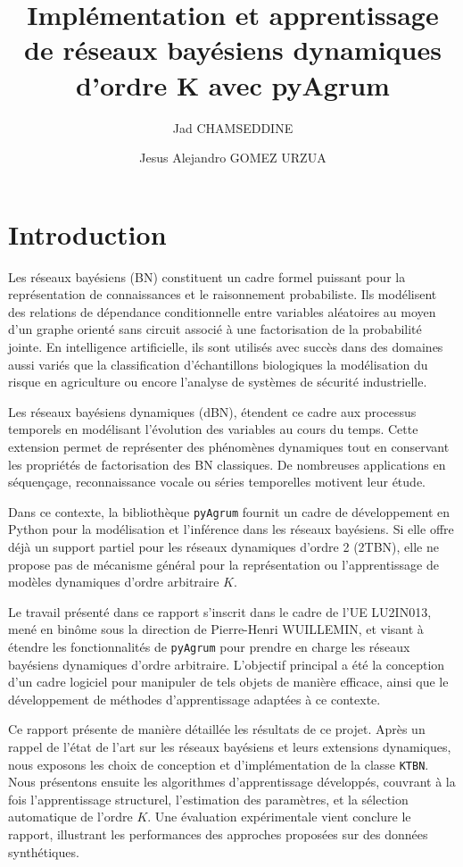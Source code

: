 \documentclass{article}
\title{Implémentation et apprentissage de réseaux bayésiens dynamiques d'ordre K avec pyAgrum}
\author{Jad CHAMSEDDINE \and Jesus Alejandro GOMEZ URZUA}
\begin{document}
\maketitle

\setcounter{tocdepth}{2}
\tableofcontents

\section{Introduction}


Les réseaux bayésiens (BN) constituent un cadre formel puissant pour la représentation de connaissances et le raisonnement
probabiliste. Ils modélisent des relations de dépendance conditionnelle entre variables aléatoires au moyen d'un graphe
orienté sans circuit associé à une factorisation de la probabilité jointe. En intelligence artificielle, ils sont utilisés
avec succès dans des domaines aussi variés que la classification d'échantillons biologiques\cite{doi:10.1021/jf9013235}
la modélisation du risque en agriculture\cite{BRESSAN2009579} ou encore l'analyse de systèmes de sécurité
industrielle\cite{KANNAN2007255}.

Les réseaux bayésiens dynamiques (dBN), étendent ce cadre aux processus temporels en modélisant l'évolution des variables
au cours du temps. Cette extension permet de représenter des phénomènes dynamiques tout en conservant les propriétés de
factorisation des BN classiques. De nombreuses applications en séquençage, reconnaissance vocale ou séries temporelles
motivent leur étude. \cite{perrin2003gene, zweig1998speech}

Dans ce contexte, la bibliothèque \texttt{pyAgrum} fournit un cadre de développement en Python pour la modélisation et
l'inférence dans les réseaux bayésiens. Si elle offre déjà un support partiel pour les réseaux dynamiques d'ordre 2
(2TBN), elle ne propose pas de mécanisme général pour la représentation ou l'apprentissage de modèles dynamiques d'ordre
arbitraire $K$.

Le travail présenté dans ce rapport s'inscrit dans le cadre de l'UE LU2IN013, mené en binôme sous la direction de
Pierre-Henri WUILLEMIN, et visant à étendre les fonctionnalités de \texttt{pyAgrum} pour prendre en charge les réseaux
bayésiens dynamiques d'ordre arbitraire. L'objectif principal a été la conception d'un cadre logiciel pour manipuler de
tels objets de manière efficace, ainsi que le développement de méthodes d'apprentissage adaptées à ce contexte.

Ce rapport présente de manière détaillée les résultats de ce projet. Après un rappel de l'état de l'art sur les réseaux
bayésiens et leurs extensions dynamiques, nous exposons les choix de conception et d'implémentation de la classe
\texttt{KTBN}. Nous présentons ensuite les algorithmes d'apprentissage développés, couvrant à la fois l'apprentissage
structurel, l'estimation des paramètres, et la sélection automatique de l'ordre $K$. Une évaluation expérimentale
vient conclure le rapport, illustrant les performances des approches proposées sur des données synthétiques.
\end{document}
